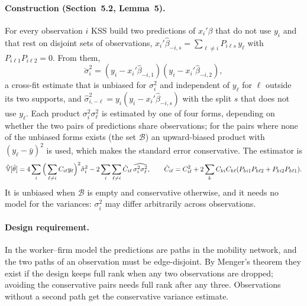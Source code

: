 \paragraph{Construction (Section~5.2, Lemma~5).} For every observation $i$ KSS build two predictions of
$x_i'\beta$ that do not use $y_i$ and that rest on disjoint sets of observations,
$x_i'\hat\beta_{-i,s}=\sum_{\ell\neq i}P_{i\ell s}\,y_\ell$ with $P_{i\ell1}P_{i\ell2}=0$. From them,
\[
\check\sigma_i^2=(y_i-x_i'\hat\beta_{-i,1})(y_i-x_i'\hat\beta_{-i,2}),
\]
a cross-fit estimate that is unbiased for $\sigma_i^2$ and independent of $y_\ell$ for $\ell$ outside its
two supports, and $\hat\sigma_{i,-\ell}^2=y_i(y_i-x_i'\hat\beta_{-i,s})$ with the split $s$ that does
not use $y_\ell$. Each product $\sigma_i^2\sigma_\ell^2$ is estimated by one of four forms, depending on
whether the two pairs of predictions share observations; for the pairs where none of the unbiased forms
exists (the set $\mathcal B$) an upward-biased product with $(y_\ell-\bar y)^2$ is used, which makes the
standard error conservative. The estimator is
\[
\hat{\mathbb{V}}[\hat\theta]=4\sum_i\Big(\sum_{\ell\neq i}C_{i\ell}y_\ell\Big)^2\check\sigma_i^2
-2\sum_i\sum_{\ell\neq i}\tilde C_{i\ell}\,\widehat{\sigma_i^2\sigma_\ell^2},
\qquad
\tilde C_{i\ell}=C_{i\ell}^2+2\sum_kC_{ki}C_{k\ell}(P_{ki1}P_{k\ell2}+P_{ki2}P_{k\ell1}).
\]
It is unbiased when $\mathcal B$ is empty and conservative otherwise, and it needs no model for the
variances: $\sigma_i^2$ may differ arbitrarily across observations.

\paragraph{Design requirement.} In the worker--firm model the predictions are paths in the mobility
network, and the two paths of an observation must be edge-disjoint. By Menger's theorem they exist if
the design keeps full rank when any two observations are dropped; avoiding the conservative pairs needs
full rank after any three. Observations without a second path get the conservative variance estimate.

